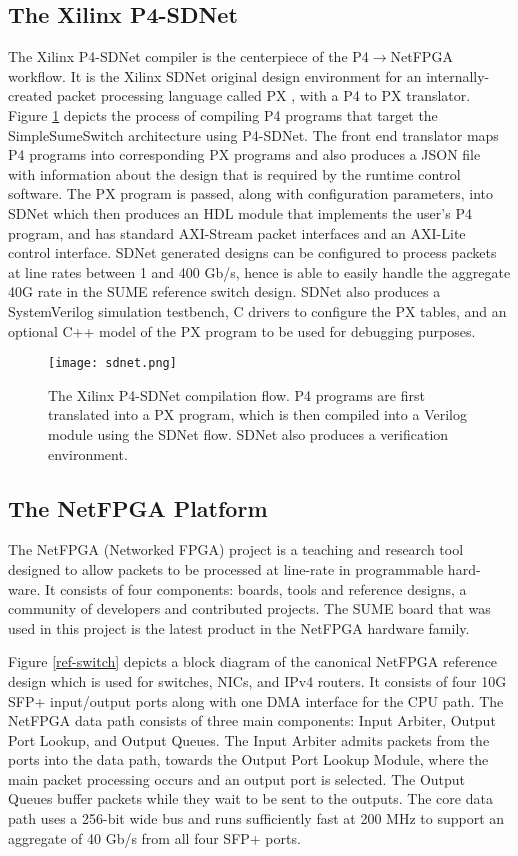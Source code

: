 \subsection{The Xilinx P4-SDNet}
The Xilinx P4-SDNet compiler is the centerpiece of the P4$\rightarrow$NetFPGA workflow. It is the Xilinx SDNet original design environment for an internally-created packet processing language called PX \cite{px}, with a P4 to PX translator. Figure \ref{sdnet} depicts the process of compiling P4 programs that target the SimpleSumeSwitch architecture using P4-SDNet. The front end translator maps P4 programs into corresponding PX programs and also produces a JSON file with information about the design that is required by the runtime control software. The PX program is passed, along with configuration parameters, into SDNet which then produces an HDL module that implements the user’s P4 program, and has standard AXI-Stream packet interfaces and an AXI-Lite control interface. SDNet generated designs can be configured to process packets at line rates between 1 and 400 Gb/s, hence is able to easily handle the aggregate 40G rate in the SUME reference switch design. SDNet also produces a SystemVerilog simulation testbench, C drivers to configure the PX tables, and an optional C++ model of the PX program to be used for debugging purposes.

\begin{figure}[!ht]
	\centering
	\texttt{[image: sdnet.png]}
	\caption{The Xilinx P4-SDNet compilation flow. P4 programs are first translated into a PX program, which is then compiled into a Verilog module using the SDNet flow. SDNet also produces a verification environment.}
	\label{sdnet}
\end{figure}

\subsection{The NetFPGA Platform}

The NetFPGA (Networked FPGA) project is a teaching and research tool designed to allow packets to be processed at line-rate in programmable hard-ware. It consists of four components: boards, tools and reference designs, a community of developers and contributed projects. The SUME board that was used in this project is the latest product in the NetFPGA hardware family. 

Figure \ref{ref-switch} depicts a block diagram of the canonical NetFPGA reference design which is used for switches, NICs, and IPv4 routers. It consists of four 10G SFP+ input/output ports along with one DMA interface for the CPU path. The NetFPGA data path consists of three main components: Input Arbiter, Output Port Lookup, and Output Queues. The Input Arbiter admits packets from the ports into the data path, towards the Output Port Lookup Module, where the main packet processing occurs and an output port is selected. The Output Queues buffer packets while they wait to be sent to the outputs. The core data path uses a 256-bit wide bus and runs sufficiently fast at 200 MHz to support an aggregate of 40 Gb/s from all four SFP+ ports.

